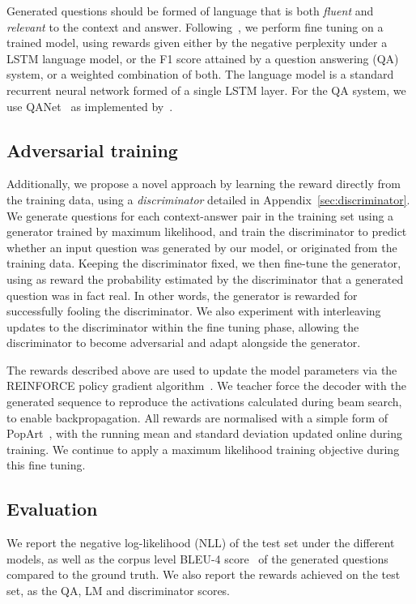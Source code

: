 \documentclass[11pt,a4paper]{article}
\begin{document}
Generated questions should be formed of language that is both \textit{fluent} and \textit{relevant} to the context and answer. Following~\citep{Maluuba}, we perform fine tuning on a trained model, using rewards given either by the negative perplexity under a LSTM language model, or the F1 score attained by a question answering (QA) system, or a weighted combination of both. The language model is a standard recurrent neural network formed of a single LSTM layer. For the QA system, we use QANet~\cite{Yu2018} as implemented by~\citet{QANetGithub}.

\subsection{Adversarial training}
Additionally, we propose a novel approach by learning the reward directly from the training data, using a \textit{discriminator} detailed in Appendix~\ref{sec:discriminator}. We generate questions for each context-answer pair in the training set using a generator trained by maximum likelihood, and train the discriminator to predict whether an input question was generated by our model, or originated from the training data. Keeping the discriminator fixed, we then fine-tune the generator, using as reward the probability estimated by the discriminator that a generated question was in fact real. In other words, the generator is rewarded for successfully fooling the discriminator. We also experiment with interleaving updates to the discriminator within the fine tuning phase, allowing the discriminator to become adversarial and adapt alongside the generator.

The rewards described above are used to update the model parameters via the REINFORCE policy gradient algorithm~\cite{Williams1992}. We teacher force the decoder with the generated sequence to reproduce the activations calculated during beam search, to enable backpropagation. All rewards are normalised with a simple form of PopArt~\cite{VanHasselt}, with the running mean  and standard deviation  updated online during training. We continue to apply a maximum likelihood training objective during this fine tuning.

\subsection{Evaluation}

We report the negative log-likelihood (NLL) of the test set under the different models, as well as the corpus level BLEU-4 score~\cite{Papineni} of the generated questions compared to the ground truth. We also report the rewards achieved on the test set, as the QA, LM and discriminator scores.
\end{document}
